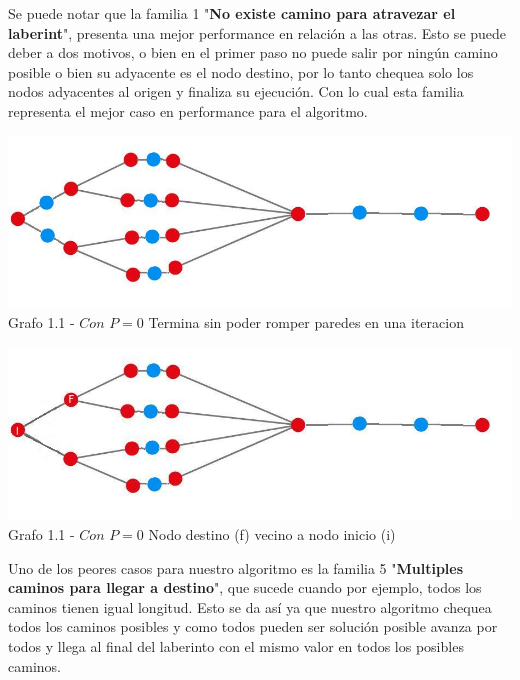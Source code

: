 Se puede notar que la familia 1 "\textbf{No existe camino para atravezar el laberint}", presenta una mejor performance en relaci\'on a las otras. Esto se puede deber a dos motivos, o bien en el primer paso no puede salir por ning\'un camino posible o bien su adyacente es el nodo destino, por lo tanto chequea solo los nodos adyacentes al origen y finaliza su ejecuci\'on. Con lo cual esta familia representa el mejor caso en performance para el algoritmo.

\vspace*{0.3cm} \vspace*{0.3cm}
  \begin{center}
\includegraphics[scale=0.7]{./EJ1/ej1grafomejorcaso.jpeg}
{Grafo 1.1 - $Con$ $P=0$ Termina sin poder romper paredes en una iteracion}
  \end{center}
  \vspace*{0.3cm}

\vspace*{0.3cm} \vspace*{0.3cm}
  \begin{center}
\includegraphics[scale=0.7]{./EJ1/ej1grafomejorcaso2.jpeg}
{Grafo 1.1 - $Con$ $P=0$ Nodo destino (f) vecino a nodo inicio (i)}
  \end{center}
  \vspace*{0.3cm}

Uno de los peores casos para nuestro algoritmo es la familia 5 "\textbf{Multiples caminos para llegar a destino}", que sucede cuando por ejemplo, todos los caminos tienen igual longitud. Esto se da as\'i ya que nuestro algoritmo chequea todos los caminos posibles y como todos pueden ser soluci\'on posible avanza por todos y llega al final del laberinto con el mismo valor en todos los posibles caminos.\\

